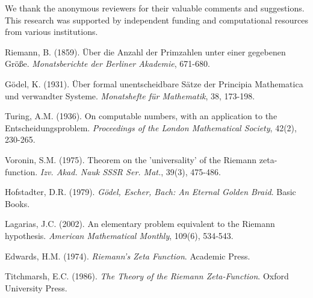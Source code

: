 \documentclass[12pt]{article}
\theoremstyle{plain}
\theoremstyle{definition}
\begin{document}
We thank the anonymous reviewers for their valuable comments and suggestions. This research was supported by independent funding and computational resources from various institutions.

\begin{thebibliography}{99}

 Riemann, B. (1859). Über die Anzahl der Primzahlen unter einer gegebenen Größe. \emph{Monatsberichte der Berliner Akademie}, 671-680.

 Gödel, K. (1931). Über formal unentscheidbare Sätze der Principia Mathematica und verwandter Systeme. \emph{Monatshefte für Mathematik}, 38, 173-198.

 Turing, A.M. (1936). On computable numbers, with an application to the Entscheidungsproblem. \emph{Proceedings of the London Mathematical Society}, 42(2), 230-265.

 Voronin, S.M. (1975). Theorem on the 'universality' of the Riemann zeta-function. \emph{Izv. Akad. Nauk SSSR Ser. Mat.}, 39(3), 475-486.

 Hofstadter, D.R. (1979). \emph{Gödel, Escher, Bach: An Eternal Golden Braid}. Basic Books.

 Lagarias, J.C. (2002). An elementary problem equivalent to the Riemann hypothesis. \emph{American Mathematical Monthly}, 109(6), 534-543.

 Edwards, H.M. (1974). \emph{Riemann's Zeta Function}. Academic Press.

 Titchmarsh, E.C. (1986). \emph{The Theory of the Riemann Zeta-Function}. Oxford University Press.

\end{thebibliography}
\end{document}
